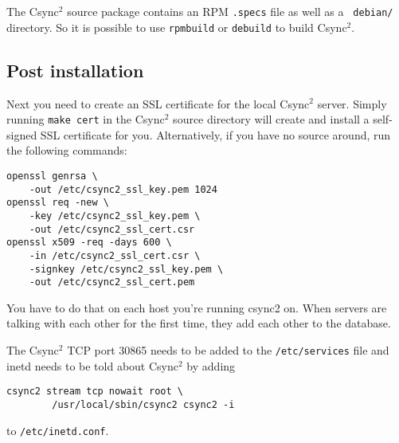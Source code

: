 \documentclass[a4paper,twocolumn]{article}
\def\csync2{{\sc Csync$^{2}$}}
\begin{document}
The \csync2 source package contains an RPM {\tt .specs} file as well as a {\tt
debian/} directory. So it is possible to use {\tt rpmbuild} or {\tt debuild} to
build \csync2.

\subsection{Post installation}

Next you need to create an SSL certificate for the local \csync2 server.
Simply running {\tt make cert} in the \csync2 source directory will create and
install a self-signed SSL certificate for you.  Alternatively, if you have no
source around, run the following commands:

\begin{verbatim}
openssl genrsa \
    -out /etc/csync2_ssl_key.pem 1024
openssl req -new \
    -key /etc/csync2_ssl_key.pem \
    -out /etc/csync2_ssl_cert.csr
openssl x509 -req -days 600 \
    -in /etc/csync2_ssl_cert.csr \
    -signkey /etc/csync2_ssl_key.pem \
    -out /etc/csync2_ssl_cert.pem
\end{verbatim}

You have to do that on each host you're running csync2 on. When servers are
talking with each other for the first time, they add each other to the database.

The \csync2 TCP port 30865 needs to be added to the {\tt /etc/services} file and
inetd needs to be told about \csync2 by adding

\begin{verbatim}
csync2 stream tcp nowait root \
        /usr/local/sbin/csync2 csync2 -i
\end{verbatim}

to {\tt /etc/inetd.conf}.

\end{document}
